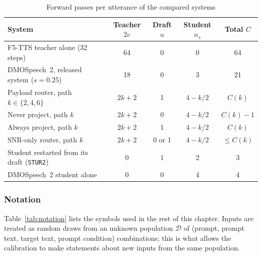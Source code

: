 \begin{table}[!htbp]
\centering\small
\caption{Forward passes per utterance of the compared systems}
\label{tab:cost}
\begin{tabular}{@{}>{\raggedright\arraybackslash}p{4.8cm} c c c c@{}}
\toprule
\textbf{System} & \textbf{Teacher $2e$} & \textbf{Draft $u$} & \textbf{Student $n_s$} & \textbf{Total $C$} \\
\midrule
F5-TTS teacher alone (32 steps) & 64 & 0 & 0 & 64 \\
DMOSpeech~2, released system ($s=0.25$) & 18 & 0 & 3 & 21 \\
Payload router, path $k\in\{2,4,6\}$ & $2k+2$ & 1 & $4-k/2$ & $C(k)$ \\
Never project, path $k$ & $2k+2$ & 0 & $4-k/2$ & $C(k)-1$ \\
Always project, path $k$ & $2k+2$ & 1 & $4-k/2$ & $C(k)$ \\
SNR-only router, path $k$ & $2k+2$ & 0 or 1 & $4-k/2$ & $\le C(k)$ \\
Student restarted from its draft (\texttt{STUR2}) & 0 & 1 & 2 & 3 \\
DMOSpeech~2 student alone & 0 & 0 & 4 & 4 \\
\bottomrule
\end{tabular}

\end{table}

\subsubsection{Notation}
Table~\ref{tab:notation} lists the symbols used in the rest of this chapter. Inputs are treated as random draws from an unknown population $\mathcal{D}$ of (prompt, prompt text, target text, prompt condition) combinations; this is what allows the calibration to make statements about new inputs from the same population.

